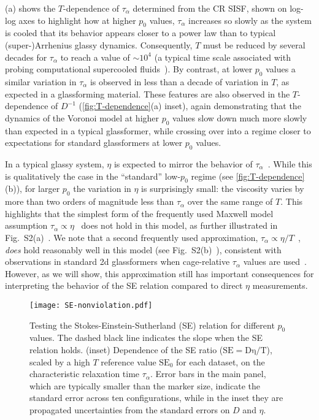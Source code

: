 \documentclass[amsmath,amssymb,prl,reprint,twocolumn]{revtex4-2}
\begin{document}
(a) shows the $T$-dependence of $\tau_{\alpha}$ determined from the CR SISF, shown on log-log axes to highlight how at higher $p_0$ values, $\tau_{\alpha}$ increases so slowly as the system is cooled that its behavior appears closer to a power law than to typical (super-)Arrhenius glassy dynamics.
Consequently, $T$ must be reduced by several decades for $\tau_{\alpha}$ to reach a value of $\sim10^4$ (a typical time scale associated with probing computational supercooled fluids~\cite{Sussman2018EPL,Kob1995}).
By contrast, at lower $p_0$ values a similar variation in $\tau_{\alpha}$ is observed in less than a decade of variation in $T$, as expected in a glassforming material. 
These features are also observed in the $T$-dependence of $D^{-1}$ (\cref{fig:T-dependence}(a) inset), again demonstrating that the dynamics of the Voronoi model at higher $p_0$ values slow down much more slowly than expected in a typical glassformer, while crossing over into a regime closer to expectations for standard glassformers at lower $p_0$ values. 

In a typical glassy system, $\eta$ is expected to mirror the behavior of $\tau_{\alpha}$~\cite{Berthier2011DHBook}. 
While this is qualitatively the case in the ``standard'' low-$p_0$ regime (see \cref{fig:T-dependence}(b)), for larger $p_0$ the variation in $\eta$ is surprisingly small: the viscosity varies by more than two orders of magnitude less than $\tau_{\alpha}$ over the same range of $T$. 
This highlights that the simplest form of the frequently used Maxwell model assumption $\tau_{\alpha}\propto\eta$~\cite{Chen2006,Kumar2007,Xu2009,Shi2013} does not hold in this model, as further illustrated in Fig.~S2(a)~\cite{Supp}.
We note that a second frequently used approximation, $\tau_{\alpha}\propto\eta/T$~\cite{Ozawa2016,Ikeda2011PRL,Ikeda2011JChemPhys,Sengupta2013}, \emph{does} hold reasonably well in this model (see Fig.~S2(b)~\cite{Supp}), consistent with observations in standard 2d glassformers when cage-relative $\tau_{\alpha}$ values are used~\cite{Shiba2019,Li2019}.
However, as we will show, this approximation still has important consequences for interpreting the behavior of the SE relation compared to direct $\eta$ measurements.


\begin{figure}[t]
\centering
\texttt{[image: SE-nonviolation.pdf]}
\vspace{-1.5\intextsep}
\caption{Testing the Stokes-Einstein-Sutherland (SE) relation for different $p_0$ values.
The dashed black line indicates the slope when the SE relation holds.
(inset) Dependence of the SE ratio ($\mathrm{SE=D\eta/T}$), scaled by a high $T$ reference value $\text{SE}_0$ for each dataset, on the characteristic relaxation time $\tau_{\alpha}$.
Error bars in the main panel, which are typically smaller than the marker size, indicate the standard error across ten configurations, while in the inset they are propagated uncertainties from the standard errors on $D$ and $\eta$.}
\label{fig:SE}
\end{figure}
\end{document}
